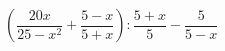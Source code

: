\begin{ex}
	\begin{condition}
		\( \left( \dfrac{20x}{25-x^2}+\dfrac{5-x}{5+x} \right) :\dfrac{5+x}{5}-\dfrac{5}{5-x}\)
	\end{condition}
\end{ex}